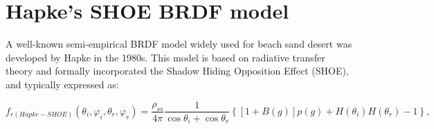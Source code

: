 \section{Hapke's SHOE BRDF model}
\label{sec:brdf-Hapke}

A well-known semi-empirical BRDF model widely used for beach sand desert was developed by Hapke in the 1980s\cite{1984_Hapke,2022_Wise,2023_Zhuang}.
This model is based on radiative transfer theory and formally incorporated the Shadow Hiding Opposition Effect (SHOE), and typically expressed as:

\begin{equation}
    f_{r(Hapke-SHOE)}(\theta_i, \varphi_i, \theta_r, \varphi_r) = \frac{\rho_{ss}}{4 \pi}%
    \frac{1}{\cos\theta_i + \cos\theta_r}%
    \left\{
    \left[1 + B(g)\right] p(g)%
    + H(\theta_i)H(\theta_r)%
    - 1
    \right\},
\end{equation}


